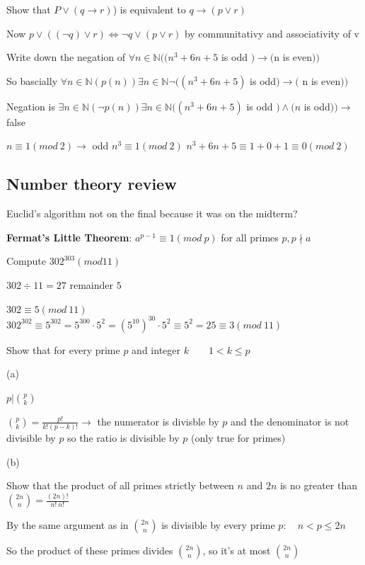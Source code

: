 \documentclass[9pt, letterpaper, oneside]{article}
\begin{document}
Show that $P \lor (q \to r)$) is equivalent to $q \to (p \lor r)$

Now $p \lor ((\lnot q) \lor r) \Leftrightarrow \lnot q \lor (p \lor r)$ by communitativy and associativity of v

Write down the negation of $\forall n \in \mathbb{N}((n^3 + 6n + 5$ is odd $)\to ($n is even$))$

So bascially $\forall n \in \mathbb{N}(p(n)) \exists n \in \mathbb{N} \lnot ((n^3 + 6n +5)$ is odd$) \to($ n is even$))$

Negation is $\exists n \in \mathbb{N} (\lnot p(n)) \exists n \in \mathbb{N}((n^3 +6n + 5)$ is odd $) \wedge (n$ is odd$)) \to$ false

$n \equiv 1 (mod \ 2) \to$ odd
$n^3 \equiv 1 (mod \ 2)$
$n^3 + 6n + 5 \equiv 1 + 0 + 1 \equiv 0 (mod \ 2)$

\subsection{Number theory review}

Euclid's algorithm not on the final because it was on the midterm?

\textbf{Fermat's Little Theorem}: $a^{p-1} \equiv 1 (mod \ p)$ for all primes $p, p \nmid a$

Compute $302^{303} (mod 11)$

$302 \div 11 = 27$ remainder $5$

$302 \equiv 5 (mod \ 11)$
$302^{302} \equiv 5^{302} = 5^{300} \cdot 5^2 = (5^{10})^{30} \cdot 5^2 \equiv 5^2 = 25 \equiv 3 (mod \ 11)$


Show that for every prime $p$ and integer $k \qquad 1 < k \leq p$ 

(a)

$p | {p \choose k}$

${p \choose k} = \frac{p!}{k!(p-k)!} \to$ the numerator is divisble by $p$ and the denominator is not divisible by $p$ so the ratio is divisible by $p$ (only true for primes)

(b)

Show that the product of all primes strictly between $n$ and $2n$ is no greater than ${2n \choose n} = \frac{(2n)!}{n! \ n!}$

By the same argument as in ${2n \choose n}$ is divisible by every prime $p: \quad n < p \leq 2n$

So the product of these primes divides ${2n \choose n}$, so it's at most ${2n \choose n}$
\end{document}
